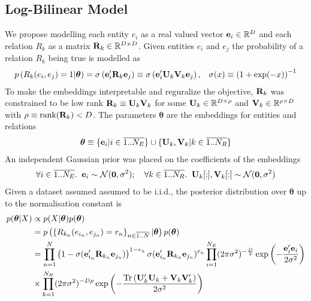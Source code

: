 \documentclass[a4paper, 11pt, fleqn]{article}
\newcommand{\btheta}[0]{\boldsymbol{\theta}}
\begin{document}
\subsection{Log-Bilinear Model}
We propose modelling each entity $e_i$ as a real valued vector ${\bf
e}_i \in \mathbb{R}^D$ and each relation $R_k$ as a matrix ${\bf R}_k
\in \mathbb{R}^{D \times D}$. Given entities $e_i$ and $e_j$
the probability of a relation $R_k$ being true is modelled as
\begin{align}
  &p\left(R_k(e_i, e_j) = 1\vert \btheta\right) = \sigma\left({\bf
      e}'_i{\bf R}_k{\bf e}_j\right) \equiv \sigma\left({\bf
      e}'_i{\bf U}_k{\bf V}_k{\bf e}_j\right),
&\sigma(x) \equiv \left(1 + \exp(-x)\right)^{-1}
\end{align}
\noindent To make the embeddings interpretable and reguralize the
objective, ${\bf R}_k$ was constrained to be low rank ${\bf R}_k
\equiv {\bf U}_k{\bf V}_k$ for
some $ {\bf U}_k \in \mathbb{R}^{D
  \times \rho}$ and $ {\bf V}_k \in \mathbb{R}^{\rho \times D}$ with
$\rho \equiv \text{rank}({\bf R}_k) < D$. The parameters $\btheta$ are
the embeddings for entities and relations
\begin{align}
\btheta \equiv \{{\bf e}_i \vert i \in \overline{1..N_E}\} \cup
 \{{\bf U}_k, {\bf V}_k \vert k \in \overline{1..N_R}\}
\end{align}
An independent Gaussian prior was placed on the coefficients of the
embeddings
\begin{align}
\forall i \in \overline{1..N_E}.\;\; {\bf e}_i \sim \mathcal{N}({\bf 0},
\sigma^2); \quad \forall k \in \overline{1..N_R}.\;\; {\bf U}_k[:],
{\bf V}_k[:] \sim
\mathcal{N}({\bf 0}, \sigma^2)
\end{align}
Given a dataset assumed assumed to be i.i.d., the posterior
distribution over $\btheta$ up to the normalisation constant is
\begin{align}
  \label{eqn:prob_dataset}
  p(\btheta\vert X) &\propto p(X\vert \btheta)p(\btheta) \nonumber \\
&= p\left(\left\{R_{k_n}(e_{i_n}, e_{j_n})=r_n\right\}_{n\in\overline{1..N}}\vert
    \btheta\right) p(\btheta)\nonumber \\
  &= \prod_{n=1}^{N}\left(1 - \sigma({\bf e}'_{i_n}{\bf R}_{k_n}{\bf
     e}_{j_n})\right)^{1 - r_n}\sigma({\bf e}'_{i_n}{\bf R}_{k_n}{\bf
      e}_{j_n})^{r_n} \prod_{i=1}^{N_E} (2\pi\sigma^2)^{-\frac{D}{2}}
    \exp\left(-\frac{{\bf e}_i'{\bf e}_i}{2\sigma^2}\right) \nonumber \\
&\times \prod_{k=1}^{N_R} (2\pi\sigma^2)^{-D\rho}
    \exp\left(-\frac{\text{Tr}\left({\bf U}_k'{\bf U}_k + {\bf V}_k{\bf V}_k'\right)}{2\sigma^2}\right)
\end{align}
\end{document}
